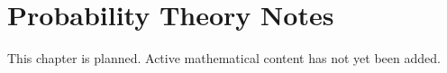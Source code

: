 
\section{Probability Theory Notes}
\begin{remark*}[Status]
This chapter is planned. Active mathematical content has not yet been added.
\end{remark*}
